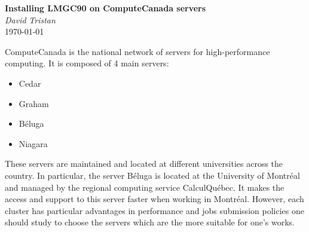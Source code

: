 \documentclass[12pt]{article}
\begin{document}
\thispagestyle{mypagestyle}

\begin{center}
  \textbf{\large Installing LMGC90 on ComputeCanada servers}\\
  \textit{David}  \hspace{0.5cm} \textit{Tristan}  \\
  \today
\end{center}




ComputeCanada is the national network of servers for high-performance computing. It is composed of 4 main servers:
\begin{itemize}
    \item Cedar
    \item Graham
    \item Béluga
    \item Niagara
\end{itemize}

These servers are maintained and located at different universities across the country. In particular, the server Béluga is located at the University of Montréal and managed by the regional computing service CalculQuébec. It makes the access and support to this server faster when working in Montréal. However, each cluster has particular advantages in performance and jobs submission policies one should study to choose the servers which are the more suitable for one's works.
\end{document}
